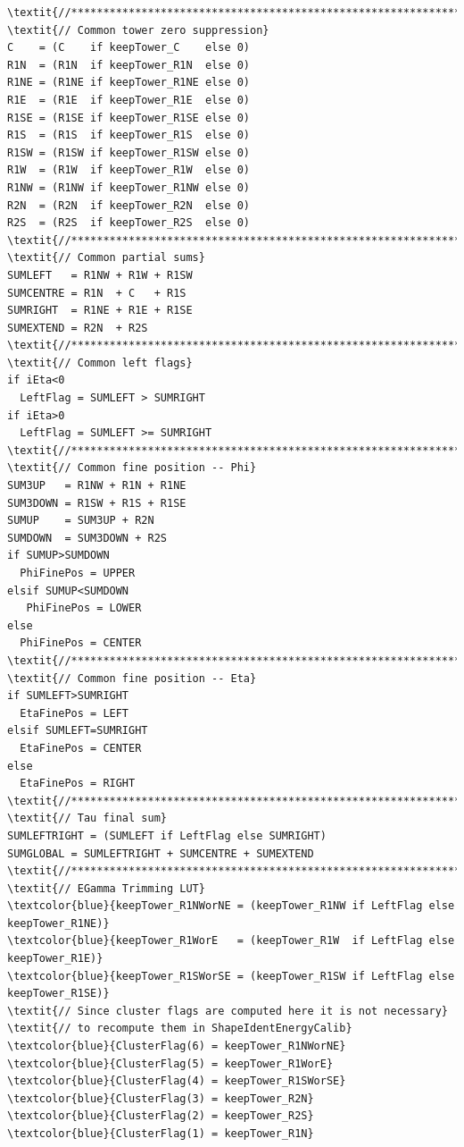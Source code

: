 \documentclass[a4paper, 12pt]{article}
\begin{document}
\begin{Verbatim}[label={Cluster trigger former}]
\textit{//******************************************************************//}
\textit{// Common tower zero suppression}
C    = (C    if keepTower_C    else 0)
R1N  = (R1N  if keepTower_R1N  else 0)
R1NE = (R1NE if keepTower_R1NE else 0)
R1E  = (R1E  if keepTower_R1E  else 0)
R1SE = (R1SE if keepTower_R1SE else 0)
R1S  = (R1S  if keepTower_R1S  else 0)
R1SW = (R1SW if keepTower_R1SW else 0)
R1W  = (R1W  if keepTower_R1W  else 0)
R1NW = (R1NW if keepTower_R1NW else 0)
R2N  = (R2N  if keepTower_R2N  else 0)
R2S  = (R2S  if keepTower_R2S  else 0)
\textit{//******************************************************************//}
\textit{// Common partial sums}
SUMLEFT   = R1NW + R1W + R1SW
SUMCENTRE = R1N  + C   + R1S
SUMRIGHT  = R1NE + R1E + R1SE
SUMEXTEND = R2N  + R2S
\textit{//******************************************************************//}
\textit{// Common left flags}
if iEta<0
  LeftFlag = SUMLEFT > SUMRIGHT
if iEta>0
  LeftFlag = SUMLEFT >= SUMRIGHT
\textit{//******************************************************************//}
\textit{// Common fine position -- Phi}
SUM3UP   = R1NW + R1N + R1NE
SUM3DOWN = R1SW + R1S + R1SE
SUMUP    = SUM3UP + R2N
SUMDOWN  = SUM3DOWN + R2S
if SUMUP>SUMDOWN
  PhiFinePos = UPPER
elsif SUMUP<SUMDOWN
   PhiFinePos = LOWER 
else
  PhiFinePos = CENTER
\textit{//******************************************************************//}
\textit{// Common fine position -- Eta}
if SUMLEFT>SUMRIGHT
  EtaFinePos = LEFT
elsif SUMLEFT=SUMRIGHT
  EtaFinePos = CENTER
else
  EtaFinePos = RIGHT
\textit{//******************************************************************//}
\textit{// Tau final sum}
SUMLEFTRIGHT = (SUMLEFT if LeftFlag else SUMRIGHT)
SUMGLOBAL = SUMLEFTRIGHT + SUMCENTRE + SUMEXTEND
\textit{//******************************************************************//}
\textit{// EGamma Trimming LUT}
\textcolor{blue}{keepTower_R1NWorNE = (keepTower_R1NW if LeftFlag else keepTower_R1NE)}
\textcolor{blue}{keepTower_R1WorE   = (keepTower_R1W  if LeftFlag else keepTower_R1E)}
\textcolor{blue}{keepTower_R1SWorSE = (keepTower_R1SW if LeftFlag else keepTower_R1SE)}
\textit{// Since cluster flags are computed here it is not necessary}
\textit{// to recompute them in ShapeIdentEnergyCalib}
\textcolor{blue}{ClusterFlag(6) = keepTower_R1NWorNE}
\textcolor{blue}{ClusterFlag(5) = keepTower_R1WorE}
\textcolor{blue}{ClusterFlag(4) = keepTower_R1SWorSE}
\textcolor{blue}{ClusterFlag(3) = keepTower_R2N}
\textcolor{blue}{ClusterFlag(2) = keepTower_R2S}
\textcolor{blue}{ClusterFlag(1) = keepTower_R1N}

\end{Verbatim}
\end{document}
